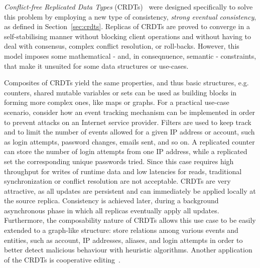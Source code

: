 \textit{Conflict-free Replicated Data Types}
(CRDTs)~\cite{Shapiro:2011:CRD:2050613.2050642} were designed specifically to
solve this problem by employing a new type of consistency, \textit{strong
eventual consistency}, as defined in Section~\ref{sec:crdts}. Replicas of CRDTs
are proved to converge in a self-stabilising manner without blocking client
operations and without having to deal with consensus, complex conflict
resolution, or roll-backs. However, this model imposes some mathematical
- and, in conseqnuence, semantic - constraints, that make it unsuited for some data structures or use-cases.

Composites of CRDTs yield the same properties, and thus basic structures, e.g. counters, shared mutable
variables or sets can be used as building blocks in forming more complex
ones, like maps or graphs. For a practical use-case scenario, consider how an
event tracking mechanism can be implemented in order to prevent attacks on an
Internet service provider. Filters are used to keep track and to limit the
number of events allowed for a given IP address or account, such as login
attempts, password changes, emails sent, and so on. A replicated counter can
store the number of login attempts from one IP address, while a replicated set
the corresponding unique passwords tried. Since this case requires high
throughput for writes of runtime data and low latencies for reads,
traditional synchronization or conflict resolution are not acceptable. CRDTs are very
attractive, as all updates are persistent and can immediately be applied locally
at the source replica. Consistency is achieved later, during a background
asynchronous phase in which all replicas eventually apply all updates.
Furthermore, the composability nature of CRDTs allows this use case to be easily
extended to a graph-like structure: store relations among various events and
entities, such as account, IP addresses, aliases, and login attempts in order to
better detect malicious behaviour with heuristic algorithms. Another application
of the CRDTs is cooperative editing~\cite{Preguica:2009:CRD:1584339.1584604}.

